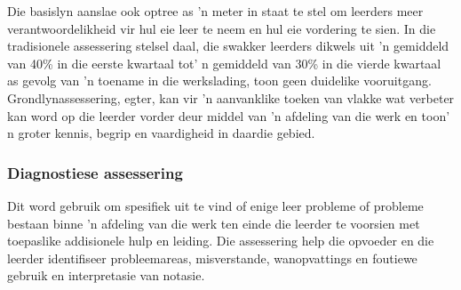 Die basislyn aanslae ook optree as 'n meter in staat te stel om leerders meer verantwoordelikheid vir hul eie leer te neem en hul eie vordering te sien. In die tradisionele assessering stelsel daal, die swakker leerders dikwels uit 'n gemiddeld van 40\% in die eerste kwartaal tot' n gemiddeld van 30\% in die vierde kwartaal as gevolg van 'n toename in die werkslading, toon geen duidelike vooruitgang. Grondlynassessering, egter, kan vir 'n aanvanklike toeken van vlakke wat verbeter kan word op die leerder vorder deur middel van 'n afdeling van die werk en toon' n groter kennis, begrip en vaardigheid in daardie gebied.

\subsubsection{Diagnostiese assessering}
Dit word gebruik om spesifiek uit te vind of enige leer probleme of probleme bestaan ​​binne 'n afdeling van die werk ten einde die leerder te voorsien met toepaslike addisionele hulp en leiding. Die assessering help die opvoeder en die leerder identifiseer probleemareas, misverstande, wanopvattings en foutiewe gebruik en interpretasie van notasie.

